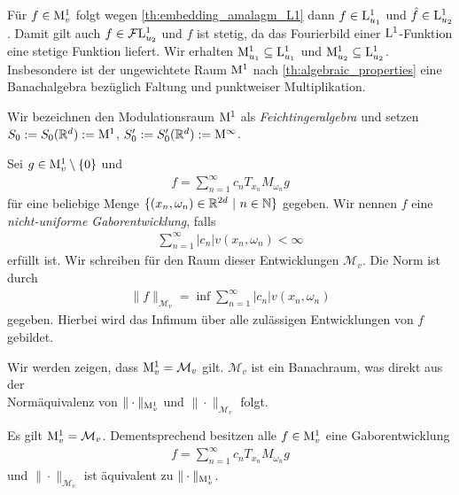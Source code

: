 Für $ f \in \mathrm{M}^1_v $ folgt
wegen \ref{th:embedding_amalagm_L1} dann $ f \in \mathrm{L}^1_{u_1} $ und $ \hat{f } \in \mathrm{L}^1_{u_2} $.
Damit gilt auch $ f \in \mathcal{F} \mathrm{L}_{u_2}^1 $ und $ f $ ist stetig, da das Fourierbild einer $ \mathrm{L}^1 $-Funktion eine stetige Funktion liefert.
Wir erhalten $ \mathrm{M}^1_{u_1} \subseteq \mathrm{L}^1_{u_1} $ und $ \mathrm{M}^1_{u_2} \subseteq \mathrm{L}^1_{u_2} $.
Insbesondere ist der ungewichtete Raum $ \mathrm{M}^1 $ nach \ref{th:algebraic_properties} eine Banachalgebra bezüglich Faltung und punktweiser Multiplikation.


\begin{df}
	Wir bezeichnen den Modulationsraum $ \mathrm{M}^1 $ als \textit{Feichtingeralgebra} und
	setzen $S_0 := S_0(\mathbb{R}^d) := \mathrm{M}^1 $, 
	$ S_0^\prime := S_0^\prime(\mathbb{R}^d) := \mathrm{M}^\infty $.
\end{df}




\begin{df}
	Sei $ g \in \mathrm{M}_v^1\setminus \{0\} $ und
	\begin{align}\label{eq:gabor_expansion_modspace}
	f = \sum \limits_{n=1}^\infty c_n T_{x_n} M_{\omega_n} g
	\end{align}
	für eine beliebige Menge $ \lbrace (x_n, \omega_n)\in \mathbb{R}^{2d} \ | \ n \in \mathbb{N} \rbrace $ gegeben. 
	Wir nennen $ f $ eine \textit{nicht-uniforme Gaborentwicklung}, falls
	\begin{align*}
	\sum \limits_{n=1}^\infty |c_n | v(x_n,\omega_n) < \infty 
	\end{align*}
	erfüllt ist. Wir schreiben für den Raum dieser Entwicklungen $ \mathcal{M}_v $.
	Die Norm ist durch
	\begin{align*}
	\| f \|_{\mathcal{M}_v} = \inf \sum \limits_{n = 1}^\infty |c_n| v(x_n,\omega_n)
	\end{align*}
	gegeben. Hierbei wird das Infimum über alle zulässigen Entwicklungen von $ f  $ gebildet.
\end{df}
Wir werden zeigen, dass $ \mathrm{M}_v^1 = \mathcal{M}_v $ gilt. 
$ \mathcal{M}_v $ ist ein Banachraum, was direkt aus der \\Normäquivalenz von $ \| \cdot \|_{\mathrm{M}^1_v} $ und $ \| \cdot \|_{\mathcal{M}_v} $ folgt.

\begin{lem}\label{th:gabor_rep_m_1_v}
	Es gilt $ \mathrm{M}_v^1 = \mathcal{M}_v $.
	Dementsprechend besitzen alle $ f \in \mathrm{M}^1_v $ eine Gaborentwicklung
	\begin{align*}
	f = \sum \limits_{n=1}^\infty c_n T_{x_n} M_{\omega_n} g
	\end{align*}
	und $ \| \cdot \|_{\mathcal{M}_v} $ ist äquivalent zu $ \| \cdot\|_{\mathrm{M}_v^1} $.
\end{lem}

